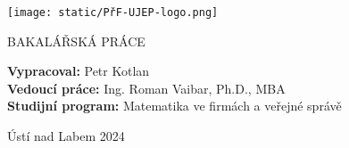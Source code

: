 \begin{titlepage}
    \begin{center}
        \Huge

        \textbf{\textsf{}}
            
        \vspace{1cm}
        \LARGE
        \textbf{\textsf{}}
        
        \vspace{2cm}
        \texttt{[image: static/PřF-UJEP-logo.png]}
        \vspace{3cm}
            
        \textbf{\textsf{}}
        
        \vspace{1cm}

        \large
        BAKALÁŘSKÁ PRÁCE

        \vfill

            \begin{flushleft}
                
            \large
            \textbf{Vypracoval:} Petr Kotlan \\
            \vspace{0.3cm}
            \textbf{Vedoucí práce:} Ing. Roman Vaibar, Ph.D., MBA \\
            \vspace{1.5cm}
            \textbf{Studijní program:} Matematika ve firmách a veřejné správě
        \end{flushleft}

        \vspace{1.5cm}
        
        \LARGE
        Ústí nad Labem 2024

    \end{center}
\end{titlepage}
